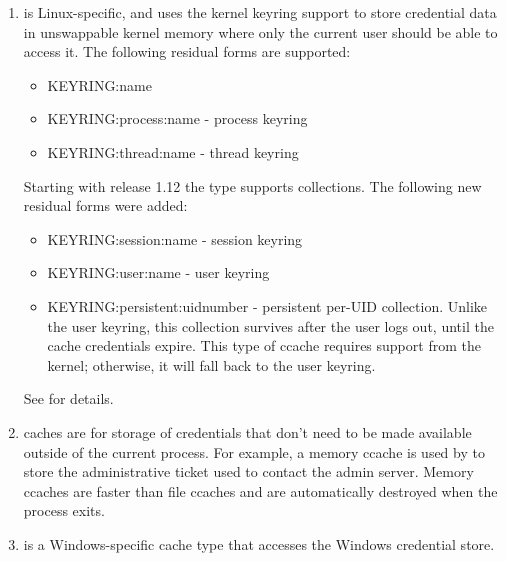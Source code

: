 \documentclass[letterpaper,10pt,english]{sphinxmanual}
\begin{document}
\begin{enumerate}
\item {} 
 is Linux-specific, and uses the kernel keyring support
to store credential data in unswappable kernel memory where only
the current user should be able to access it.  The following
residual forms are supported:
\begin{itemize}
\item {} 
KEYRING:name

\item {} 
KEYRING:process:name - process keyring

\item {} 
KEYRING:thread:name -  thread keyring

\end{itemize}

Starting with release 1.12 the  type supports collections.
The following new residual forms were added:
\begin{itemize}
\item {} 
KEYRING:session:name - session keyring

\item {} 
KEYRING:user:name - user keyring

\item {} 
KEYRING:persistent:uidnumber - persistent per-UID collection.
Unlike the user keyring, this collection survives after the user
logs out, until the cache credentials expire.  This type of
ccache requires support from the kernel; otherwise, it will fall
back to the user keyring.

\end{itemize}

See {\hyperref[\detokenize{basic/ccache_def:col-ccache}]{}} for details.

\item {} 
 caches are for storage of credentials that don’t need to
be made available outside of the current process.  For example, a
memory ccache is used by  to store the
administrative ticket used to contact the admin server.  Memory
ccaches are faster than file ccaches and are automatically
destroyed when the process exits.

\item {} 
 is a Windows-specific cache type that accesses the
Windows credential store.

\end{enumerate}
\end{document}
